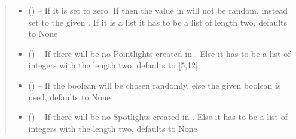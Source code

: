 \documentclass[letterpaper,10pt,english]{sphinxmanual}
\begin{document}
\begin{fulllineitems}
\begin{fulllineitems}
\begin{quote}
\begin{description}
\begin{itemize}
\item {} 
 (\sphinxstyleliteralemphasis{\sphinxupquote{, }}\sphinxstyleliteralemphasis{\sphinxupquote{, }}) -- If  it is set to zero. If  then the value in {\hyperref[\detokenize{index:dataset.dataset_cuboids.create_random_parameters}]{}} will not be random, instead set to the given . If it is a list it has to be a list of length two, defaults to None

\item {} 
 (\sphinxstyleliteralemphasis{\sphinxupquote{, }}) -- If  there will be no Pointlights created in {\hyperref[\detokenize{index:dataset.dataset_cuboids.create_random_parameters}]{}}. Else it has to be a list of integers with the length two, defaults to {[}5,12{]}

\item {} 
 (\sphinxstyleliteralemphasis{\sphinxupquote{, }}) -- If  the boolean will be chosen randomly, else the given boolean is used, defaults to None

\item {} 
 (\sphinxstyleliteralemphasis{\sphinxupquote{, }}) -- If  there will be no Spotlights created in {\hyperref[\detokenize{index:dataset.dataset_cuboids.create_random_parameters}]{}}. Else it has to be a list of integers with the length two, defaults to None


\end{itemize}
\end{description}
\end{quote}
\end{fulllineitems}
\end{fulllineitems}
\end{document}
